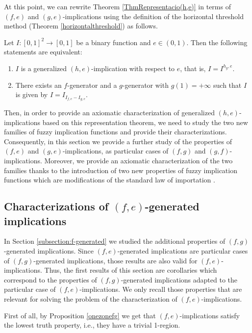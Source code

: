 At this point, we can rewrite Theorem \ref{ThmRepresentacio(h,e)} in terms of $(f,e)$ and $(g,e)$-implications using the definition of the horizontal threshold method (Theorem \ref{horizontalthreshold}) as follows.
\begin{corollary} Let $I:[0,1]^2 \to [0,1]$ be a binary function and $e \in (0,1)$. Then the following statements are equivalent:
	\begin{enumerate}[label=(\roman*)]
		\item $I$ is a generalized $(h,e)$-implication with respect to $e$, that is, $I=I^{h_g,e}$.
		\item There exists an $f$-generator and a $g$-generator with $g(1)=+\infty$ such that $I$ is given by $I=I_{I_{f,e} - I_{g,e}}$.
	\end{enumerate}
\end{corollary}

Then, in order to provide an axiomatic characterization of generalized $(h,e)$-implications based on this representation theorem, we need to study the two new families of fuzzy implication functions and provide their characterizations. Consequently, in this section we provide a further study of the properties of $(f,e)$ and $(g,e)$-implications, as particular cases of $(f,g)$ and $(g,f)$-implications. Moreover, we provide an axiomatic characterization of the two families thanks to the introduction of two new properties of fuzzy implication functions which are modifications of the standard law of importation \LI.

\subsection{Characterizations of $(f,e)$-generated implications}
In Section \ref{subsection:f-generated} we studied the additional properties of $(f,g)$-generated implications. Since $(f,e)$-generated implications are particular cases of $(f,g)$-generated implications, those results are also valid for $(f,e)$-implications. Thus, the first results of this section are corollaries which correspond to the properties of $(f,g)$-generated implications adapted to the particular case of $(f,e)$-implications. We only recall those properties that are relevant for solving the problem of the characterization of $(f,e)$-implications.

First of all, by Proposition \ref{onezonefg} we get that $(f,e)$-implications satisfy the lowest truth property, i.e., they have a trivial 1-region.

